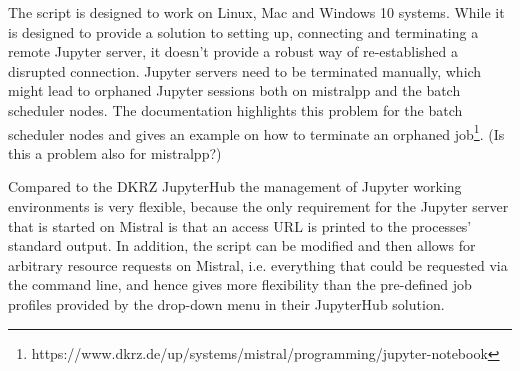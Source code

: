The script is designed to work on Linux, Mac and Windows 10 systems.
While it is designed to provide a solution to setting up, connecting and terminating a remote Jupyter server, it doesn't provide a robust way of re-established a disrupted connection.
Jupyter servers need to be terminated manually, which might lead to orphaned Jupyter sessions both on mistralpp and the batch scheduler nodes.
The documentation highlights this problem for the batch scheduler nodes and gives an example on how to terminate an orphaned job\footnote{https://www.dkrz.de/up/systems/mistral/programming/jupyter-notebook}.
(Is this a problem also for mistralpp?)

Compared to the DKRZ JupyterHub the management of Jupyter working environments is very flexible, because the only requirement for the Jupyter server that is started on Mistral is that an access URL is printed to the processes' standard output.
In addition, the script can be modified and then allows for arbitrary resource requests on Mistral, i.e. everything that could be requested via the command line, and hence gives more flexibility than the pre-defined job profiles provided by the drop-down menu in their JupyterHub solution.
